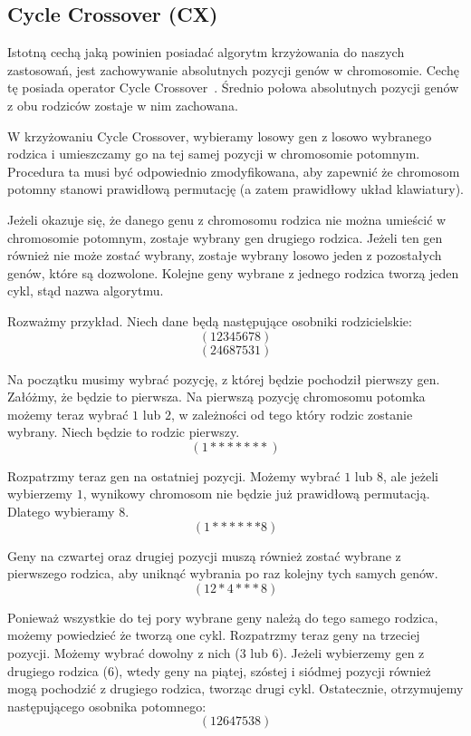 \documentclass[brudnopis]{xmgr}
\begin{document}
\subsection{Cycle Crossover (CX)}

Istotną cechą jaką powinien posiadać algorytm krzyżowania do naszych zastosowań, jest zachowywanie absolutnych pozycji genów w chromosomie. Cechę tę posiada operator Cycle Crossover~\cite{Larranaga99geneticalgorithms}. Średnio połowa absolutnych pozycji genów z obu rodziców zostaje w nim zachowana.

W krzyżowaniu Cycle Crossover, wybieramy losowy gen z losowo wybranego rodzica i umieszczamy go na tej samej pozycji w chromosomie potomnym. Procedura ta musi być odpowiednio zmodyfikowana, aby zapewnić że chromosom potomny stanowi prawidłową permutację (a zatem prawidłowy układ klawiatury).

Jeżeli okazuje się, że danego genu z chromosomu rodzica nie można umieścić w chromosomie potomnym, zostaje wybrany gen drugiego rodzica. Jeżeli ten gen również nie może zostać wybrany, zostaje wybrany losowo jeden z pozostałych genów, które są dozwolone. Kolejne geny wybrane z jednego rodzica tworzą jeden cykl, stąd nazwa algorytmu.

Rozważmy przykład. Niech dane będą następujące osobniki rodzicielskie:
$$ (1 2 3 4 5 6 7 8) $$
$$ (2 4 6 8 7 5 3 1) $$

Na początku musimy wybrać pozycję, z której będzie pochodził pierwszy gen. Załóżmy, że będzie to pierwsza. Na pierwszą pozycję chromosomu potomka możemy teraz wybrać $1$ lub $2$, w zależności od tego który rodzic zostanie wybrany. Niech będzie to rodzic pierwszy.
$$ (1 * * * * * * *) $$

Rozpatrzmy teraz gen na ostatniej pozycji. Możemy wybrać $1$ lub $8$, ale jeżeli wybierzemy $1$, wynikowy chromosom nie będzie już prawidłową permutacją. Dlatego wybieramy $8$.
$$ (1 * * * * * * 8) $$

Geny na czwartej oraz drugiej pozycji muszą również zostać wybrane z pierwszego rodzica, aby uniknąć wybrania po raz kolejny tych samych genów.
$$ (1 2 * 4 * * * 8) $$

Ponieważ wszystkie do tej pory wybrane geny należą do tego samego rodzica, możemy powiedzieć że tworzą one cykl. Rozpatrzmy teraz geny na trzeciej pozycji. Możemy wybrać dowolny z nich ($3$ lub $6$). Jeżeli wybierzemy gen z drugiego rodzica ($6$), wtedy geny na piątej, szóstej i siódmej pozycji również mogą pochodzić z drugiego rodzica, tworząc drugi cykl. Ostatecznie, otrzymujemy następującego osobnika potomnego:
$$ (1 2 6 4 7 5 3 8) $$
\end{document}
